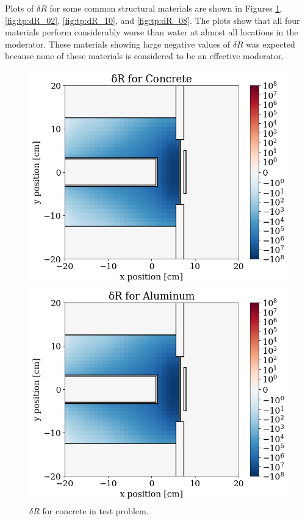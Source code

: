 Plots of $\delta R$ for some common structural materials are shown in Figures \ref{fig:tp:dR_07}, \ref{fig:tp:dR_02}, \ref{fig:tp:dR_10}, and \ref{fig:tp:dR_08}.
The plots show that all four materials perform considerably worse than water at almost all locations in the moderator. 
These materials showing large negative values of $\delta R$ was expected because none of these materials is considered to be an effective moderator.

\begin{figure}
  \begin{minipage}{0.495\linewidth}
    \centering
    \includegraphics[width=\linewidth]{content/testprob/dR_07.png}
    \caption{$\delta R$ for concrete in test problem.}
    \label{fig:tp:dR_07}
  \end{minipage}
  \hfill
  \begin{minipage}{0.495\linewidth}
    \centering
    \includegraphics[width=\linewidth]{content/testprob/dR_02.png}

\end{minipage}
\end{figure}
